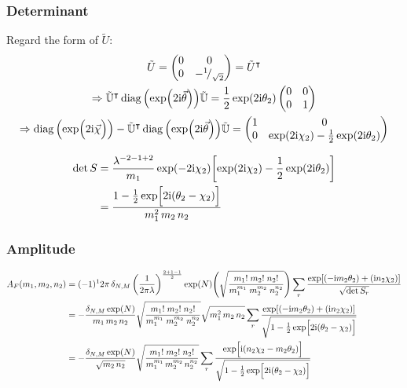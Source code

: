 \documentclass[
	english,
	a4paper,
	fontsize=10pt,
	parskip=half,
	titlepage=true,
	DIV=12,
	final
]{scrreprt}
\newcommand*{\Thus}{\ensuremath{\Rightarrow}\xspace}
\newcommand*{\smallfrac}  [2]{\ensuremath{{}^        {#1} \!/_        {#2}}}
\newcommand*{\transp}{\ensuremath{^\intercal}}
\newcommand*{\iunit}{\ensuremath{\mathrm{i}}}
\DeclareMathOperator{\diag}{diag}
\begin{document}
\subsubsection{Determinant}
Regard the form of $\tilde{U}$:
\begin{gather}
	\tilde{U}
=
	\begin{pmatrix}
		0 & 0 \\ 0 & -\smallfrac{1}{\sqrt{2}}
	\end{pmatrix}
=
	\tilde{U}\transp
\\
	\Thus
	\tilde{\mathbb{U}}\transp
	\diag\qty(\exp(2\iunit\vec{\theta}))
	\tilde{\mathbb{U}}
=
	\frac{1}{2} \exp(2\iunit \theta_2)
	\begin{pmatrix}
		0 & 0 \\ 0 & 1
	\end{pmatrix}
\\
	\Thus
	\diag\qty( \exp(\Big.2\iunit\vec{\chi}) )
	-
	\tilde{\mathbb{U}}\transp
	\diag\qty(\exp(2\iunit\vec{\theta}))
	\tilde{\mathbb{U}}
=
	\begin{pmatrix}
		1 & 0 \\
		0 & \exp(2\iunit \chi_2) - \frac{1}{2} \exp(2\iunit \theta_2)
	\end{pmatrix}	
\end{gather}

\begin{align}
	\det S
&=
	\frac{ \lambda^{-2 - 1 + 2} }{ m_1 }
	\exp(-2\iunit \chi_2)
	\qty[ 
		\exp(2\iunit \chi_2) - \frac{1}{2} \exp(2\iunit \theta_2)
	] \\
&=
	\frac
		{1 - \frac{1}{2} \exp[\Big. 2\iunit (\theta_2 - \chi_2)]}
		{m_1^2 \, m_2 \, n_2}
\end{align}

\subsubsection{Amplitude}
\begin{align}
	A_F(m_1, m_2, n_2)
&=
	(-1)^1 2\pi \, \delta_{N,M} \, \qty(
		\frac{1}{2\pi\lambda}
	)^{\frac{2 + 1 - 1}{2}}
	\exp(N)
	\qty(
		\sqrt{\frac
			{ m_1!      \; m_2!     \; n_2! }
			{ m_1^{m_1} \;m_2^{m_2} \; n_2^{n_2} }
	})
	\sum_r
		\frac
		{\exp[
			\qty(- \iunit m_2 \theta_2) + 
			\qty(  \iunit n_2 \chi  _2)
		]}
		{\sqrt{\det S_r}}
	\\
&=
\nonumber
	-\frac
		{\delta_{N,M} \exp(N)}
		{m_1 \, m_2 \, n_2}
	\sqrt{\frac
		{ m_1!      \; m_2!     \; n_2! }
		{ m_1^{m_1} \;m_2^{m_2} \; n_2^{n_2} }
	}
	\sqrt{m_1^2 \, m_2 \, n_2}
	\sum_r
		\frac
		{\exp[
			\qty(- \iunit m_2 \theta_2) + 
			\qty(  \iunit n_2 \chi  _2)
		]}
		{\sqrt{1 - \frac{1}{2} \exp[\Big. 2\iunit (\theta_2 - \chi_2)]}}
	\\
&=
	-\frac
		{\delta_{N,M} \exp(N)}
		{\sqrt{m_2 \, n_2}}
	\sqrt{\frac
		{ m_1!      \; m_2!     \; n_2! }
		{ m_1^{m_1} \,m_2^{m_2} \, n_2^{n_2} }
	}
	\sum_r \frac
		{\exp[ \Big. \iunit
			\qty( n_2 \chi_2 - m_2 \theta_2 )
		]}
		{\sqrt{1 - \frac{1}{2} \exp[\Big. 2\iunit (\theta_2 - \chi_2)]}}
\end{align}
\end{document}
